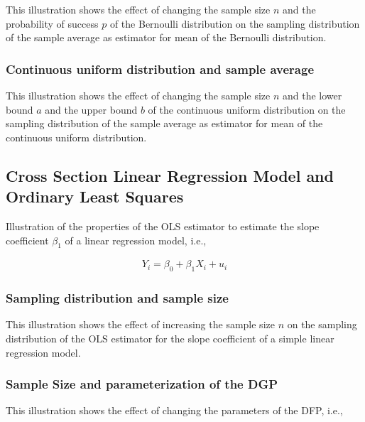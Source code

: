 \documentclass{article}
\begin{document}

This illustration shows the effect of changing the sample size $n$ and the probability of success $p$ of the Bernoulli distribution on the sampling distribution of the sample average as estimator for mean of the Bernoulli distribution.

\subsubsection{Continuous uniform distribution and sample average}


This illustration shows the effect of changing the sample size $n$ and the lower bound $a$ and the upper bound $b$ of the continuous uniform distribution on the sampling distribution of the sample average as estimator for mean of the continuous uniform distribution.

\subsection{Cross Section Linear Regression Model and Ordinary Least Squares}

Illustration of the properties of the OLS estimator to estimate the slope coefficient $\beta_{1}$ of a linear regression model, i.e.,

\begin{align}
	Y_{i} = \beta_{0} + \beta_{1} X_{i} + u_{i}
\end{align}

\subsubsection{Sampling distribution and sample size}


This illustration shows the effect of increasing the sample size $n$ on the sampling distribution of the OLS estimator for the slope coefficient of a simple linear regression model.

\subsubsection{Sample Size and parameterization of the DGP}


This illustration shows the effect of changing the parameters of the DFP, i.e.,  
\end{document}
